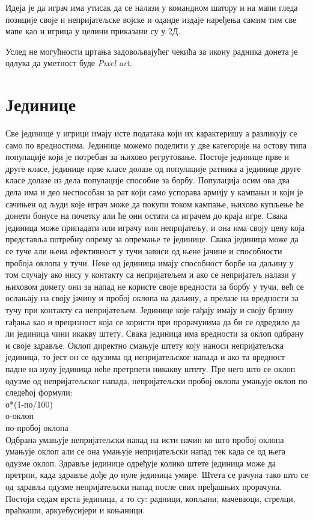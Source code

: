 \documentclass[11pt,a4paper]{report}
\begin{document}
Идеја је да играч има утисак да се налази у командном шатору и на мапи гледа позиције своје и непријатељске војске и оданде издаје наређења самим тим све мапе као и игрица у целини приказани су у 2Д.

Услед не могућности цртања задовољвајућег чекића за икону радника донета је одлука да уметност буде \emph{Pixel art}.

\section{Јединице}
Све јединице у игрици имају исте података који их карактеришу а разликују се само по вредностима. Јединице можемо поделити у две категорије на остову типа популације који је потребан за њихово регрутовање. Постоје јединице прве и друге класе, јединице прве класе долазе од популације ратника а јединице друге класе долазе из дела популације способне за борбу. Популација осим ова два дела има и део неспособан за рат који само успорава армију у кампањи и који је сачињен од људи које играч може да покупи током кампање, њихово купљење ће донети бонусе на почетку али ће они остати са играчем до краја игре. Свака јединица може припадати или играчу или непријатељу, и она има своју цену која представља потребну опрему за опремање те јединице. Свака јединица може да се туче али њена ефективност у тучи зависи од њене јачине и способности пробоја оклопа у тучи. Неке од јединица имају способност борбе на даљину у том случају ако нису у контакту са непријатељем и ако се непријатељ налази у њиховом домету они за напад не користе своје вредности за борбу у тучи, већ се ослањају на своју јачину и пробој оклопа на даљину, а прелазе на вредности за тучу при контакту са непријатељем. Јединице које гађају имају и своју брзину гађања као и прецизност која се користи при прорачунима да би се одредило да ли јединица чини икакву штету. Свака јединица има вредности за оклоп одбрану и своје здравље. Оклоп директно смањује штету коју наноси непријатељска јединица, то јест он се одузима од непријатељског напада и ако та вредност падне на нулу јединица неће претрпети никакву штету. Пре него што се оклоп одузме од непријатељског напада, непријатељски пробој оклопа умањује оклоп по следећој формули:
\\ о*(1-по/100)
\\ о-оклоп 
\\ по-пробој оклопа
\\ Одбрана умањује непријатељски напад на исти начин ко што пробој оклопа умањује оклоп али се она умањује непријатељски напад тек када се од њега одузме оклоп. Здравље јединице одређује колико штете јединица може да претрпи, када здравље дође до нуле јединица умире. Штета се рачуна тако што се од здравља одузме непријатељски напад после свих пређашњих прорачуна. Постоји седам врста јединица, а то су: радници, копљани, мачеваоци, стрелци, праћкаши, аркуебусијери и коњаници.
\end{document}
